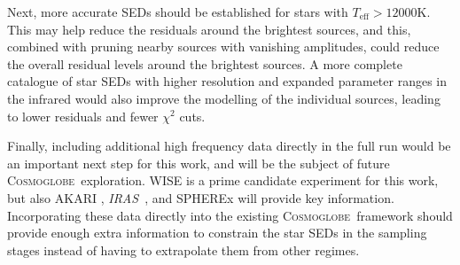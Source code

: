 \documentclass{aa}
\def\Cosmoglobe{\textsc{Cosmoglobe}}
\def\IRAS{\textit{{IRAS}}}
\begin{document}
Next, more accurate SEDs should be established for stars with $T_{\mathrm{eff}}>12000$K. This may help reduce the residuals around the brightest sources, and this, combined with pruning nearby sources with vanishing amplitudes, could reduce the overall residual levels around the brightest sources. A more complete catalogue of star SEDs with higher resolution and expanded parameter ranges in the infrared would also improve the modelling of the individual sources, leading to lower residuals and fewer $\chi^2$ cuts.

Finally, including additional high frequency data directly in the full run would be an important next step for this work, and will be the subject of future \Cosmoglobe\ exploration. WISE is a prime candidate experiment for this work, but also AKARI \citep{akari}, \IRAS\ \citep{neugebauer:1984}, and SPHEREx \citep{Crill_2020} will provide key information. Incorporating these data directly into the existing \Cosmoglobe\ framework should provide enough extra information to constrain the star SEDs in the sampling stages instead of having to extrapolate them from other regimes. 
\end{document}
